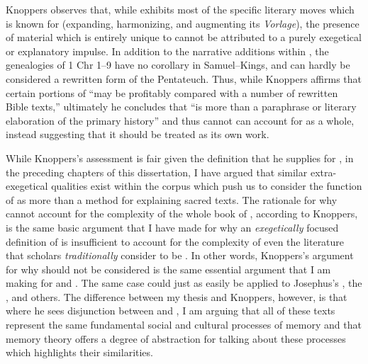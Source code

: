 Knoppers observes that, while \chronicles exhibits most of the specific literary moves which \rwb is known for (expanding, harmonizing, and augmenting its \emph{Vorlage}), the presence of material which is entirely unique to \chronicles cannot be attributed to a purely exegetical or explanatory impulse. In addition to the narrative additions within \chronicles, the genealogies of 1 Chr 1--9 have no corollary in Samuel--Kings, and can hardly be considered a rewritten form of the Pentateuch.\autocite[132]{knoppers2003} Thus, while Knoppers affirms that certain portions of \chronicles ``may be profitably compared with a number of rewritten Bible texts,''\autocite[131]{knoppers2003} ultimately he concludes that \chronicles ``is more than a paraphrase or literary elaboration of the primary history''\autocite[134]{knoppers2003} and thus \rwb cannot can account for \chronicles as a whole, instead suggesting that it should be treated as its own work.\autocite[131--134]{knoppers2003} 

While Knoppers's assessment is fair given the definition that he supplies for \rwb, in the preceding chapters of this dissertation, I have argued that similar extra-exegetical qualities exist within the \rwb corpus which push us to consider the function of \rwb as more than a method for explaining sacred texts. The rationale for why \rwb cannot account for the complexity of the whole book of \chronicles, according to Knoppers, is the same basic argument that I have made for why an \emph{exegetically} focused definition of \rwb is insufficient to account for the complexity of even the literature that scholars \emph{traditionally} consider to be \rwb. In other words, Knoppers's argument for why \chronicles should not be considered \rwb is the same essential argument that I am making for \ga and \jub. The same case could just as easily be applied to Josephus's \ant, the \templescroll, and others. The difference between my thesis and Knoppers, however, is that where he sees disjunction between \rwb and \chronicles, I am arguing that all of these texts represent the same fundamental social and cultural processes of memory and that memory theory offers a degree of abstraction for talking about these processes which highlights their similarities.

